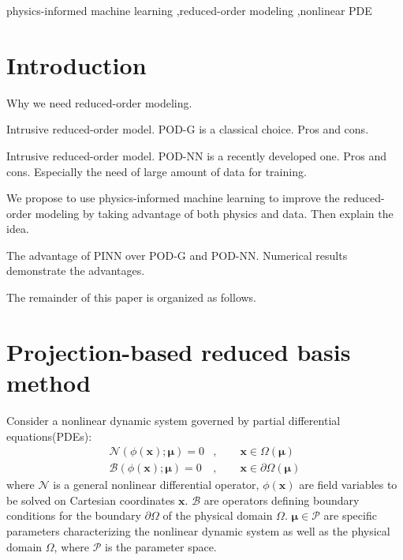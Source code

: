 \documentclass[preprint, 10pt]{elsarticle}
\begin{document}
\begin{frontmatter}
\begin{abstract}
\end{abstract}

\begin{keyword}
   physics-informed machine learning \sep reduced-order modeling \sep nonlinear PDE



\end{keyword}

\end{frontmatter}


\section{Introduction}
Why we need reduced-order modeling.

Intrusive reduced-order model. POD-G is a classical choice. Pros and cons.

Intrusive reduced-order model. POD-NN is a recently developed one. Pros and cons. Especially the need of large amount of data for training.

We propose to use physics-informed machine learning to improve the reduced-order modeling by taking advantage of both physics and data. Then explain the idea.

The advantage of PINN over POD-G and POD-NN. Numerical results demonstrate the advantages.

The remainder of this paper is organized as follows.

\section{Projection-based reduced basis method}\label{sec:POD-G}
Consider a nonlinear dynamic system governed by partial differential equations(PDEs):
\begin{equation}
\begin{aligned}
\mathcal{N}\left(\phi\left(\mathbf{x}\right); \pmb{\mu}\right)=0&,  \qquad \mathbf{x} \in \Omega\left(\pmb{\mu}\right)  \\
\mathcal{B}\left(\phi\left(\mathbf{x}\right); \pmb{\mu}\right)=0&,  \qquad \mathbf{x} \in \partial \Omega\left(\pmb{\mu}\right)
\end{aligned}
\label{eq_GoverningEqs}
\end{equation}
where $\mathcal{N}$ is a general nonlinear differential operator, $\phi\left(\mathbf{x}\right)$ are field variables to be solved on Cartesian coordinates $\mathbf{x}$. $\mathcal{B}$ are operators defining boundary conditions for the boundary $\partial \Omega$ of the physical  domain $\Omega$. $\pmb{\mu} \in \mathcal{P}$ are specific parameters characterizing the nonlinear dynamic system as well as the physical domain $\Omega$, where $\mathcal{P}$ is the parameter space.
\end{document}
